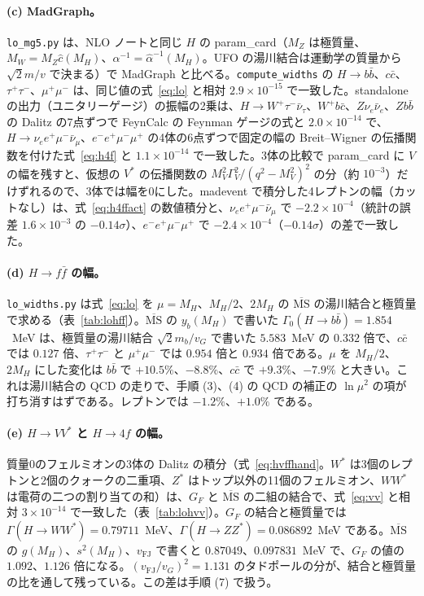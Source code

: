 \documentclass[a4paper,10pt]{ltjsarticle}
\newcommand{\MSbar}{\overline{\mathrm{MS}}}
\begin{document}
\paragraph{(c) MadGraph。}\texttt{lo\_mg5.py} は、NLO ノートと同じ $H$ の param\_card（$M_Z$ は極質量、$M_W=M_Z\hat c(M_H)$、$\alpha^{-1}=\hat\alpha^{-1}(M_H)$。UFO の湯川結合は運動学の質量から $\sqrt2m/v$ で決まる）で MadGraph と比べる。\texttt{compute\_widths} の $H\to b\bar b$、$c\bar c$、$\tau^+\tau^-$、$\mu^+\mu^-$ は、同じ値の式~\eqref{eq:lo} と相対 $2.9\times10^{-15}$ で一致した。standalone の出力（ユニタリーゲージ）の振幅の2乗は、$H\to W^+\tau^-\bar\nu_\tau$、$W^+b\bar c$、$Z\nu_e\bar\nu_e$、$Zb\bar b$ の Dalitz の7点ずつで FeynCalc の Feynman ゲージの式と $2.0\times10^{-14}$ で、$H\to\nu_ee^+\mu^-\bar\nu_\mu$、$e^-e^+\mu^-\mu^+$ の4体の6点ずつで固定の幅の Breit--Wigner の伝播関数を付けた式~\eqref{eq:h4f} と $1.1\times10^{-14}$ で一致した。3体の比較で param\_card に $V$ の幅を残すと、仮想の $V^*$ の伝播関数の $M_V^2\Gamma_V^2/(q^2-M_V^2)^2$ の分（約 $10^{-3}$）だけずれるので、3体では幅を0にした。madevent で積分した4レプトンの幅（カットなし）は、式~\eqref{eq:h4ffact} の数値積分と、$\nu_ee^+\mu^-\bar\nu_\mu$ で $-2.2\times10^{-4}$（統計の誤差 $1.6\times10^{-3}$ の $-0.14\sigma$）、$e^-e^+\mu^-\mu^+$ で $-2.4\times10^{-4}$（$-0.14\sigma$）の差で一致した。

\paragraph{(d) $H\to f\bar f$ の幅。}\texttt{lo\_widths.py} は式~\eqref{eq:lo} を $\mu=M_H$、$M_H/2$、$2M_H$ の $\MSbar$ の湯川結合と極質量で求める（表~\ref{tab:lohff}）。$\MSbar$ の $y_b(M_H)$ で書いた $\Gamma_0(H\to b\bar b)=1.854$~MeV は、極質量の湯川結合 $\sqrt2m_b/v_G$ で書いた $5.583$~MeV の $0.332$ 倍で、$c\bar c$ では $0.127$ 倍、$\tau^+\tau^-$ と $\mu^+\mu^-$ では $0.954$ 倍と $0.934$ 倍である。$\mu$ を $M_H/2$、$2M_H$ にした変化は $b\bar b$ で $+10.5\%$、$-8.8\%$、$c\bar c$ で $+9.3\%$、$-7.9\%$ と大きい。これは湯川結合の QCD の走りで、手順 (3)、(4) の QCD の補正の $\ln\mu^2$ の項が打ち消すはずである。レプトンでは $-1.2\%$、$+1.0\%$ である。

\paragraph{(e) $H\to VV^*$ と $H\to4f$ の幅。}質量0のフェルミオンの3体の Dalitz の積分（式~\eqref{eq:hvffhand}。$W^*$ は3個のレプトンと2個のクォークの二重項、$Z^*$ はトップ以外の11個のフェルミオン、$WW^*$ は電荷の二つの割り当ての和）は、$G_F$ と $\MSbar$ の二組の結合で、式~\eqref{eq:vv} と相対 $3\times10^{-14}$ で一致した（表~\ref{tab:lohvv}）。$G_F$ の結合と極質量では $\Gamma(H\to WW^*)=0.79711$~MeV、$\Gamma(H\to ZZ^*)=0.086892$~MeV である。$\MSbar$ の $g(M_H)$、$s^2(M_H)$、$v_{\mathrm{FJ}}$ で書くと $0.87049$、$0.097831$~MeV で、$G_F$ の値の $1.092$、$1.126$ 倍になる。$(v_{\mathrm{FJ}}/v_G)^2=1.131$ のタドポールの分が、結合と極質量の比を通して残っている。この差は手順 (7) で扱う。
\end{document}
